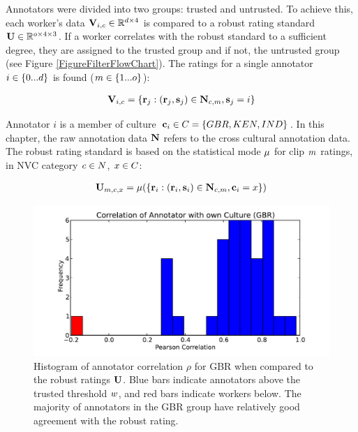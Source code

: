 Annotators were divided into two groups: trusted and untrusted. To achieve this, each worker's data $\textbf{V}_{i, c} \in \mathbb{R}^{d \times 4}$ is compared to a robust rating standard $\textbf{U} \in \mathbb{R}^{o \times 4 \times 3}$. If a worker correlates with the robust standard to a sufficient degree, they are assigned to the trusted group and if not, the untrusted group (see Figure \ref{FigureFilterFlowChart}). The ratings for a single annotator $i \in \{0...d\}$ is found ($m \in \{1...o\}$):

\begin{gather}
\textbf{V}_{i, c} = \{\textbf{r}_j: (\textbf{r}_j, \textbf{s}_j) \in \textbf{N}_{c,m}, \textbf{s}_j=i\} 
\end{gather}

Annotator $i$ is a member of culture $\textbf{c}_i \in C = \{GBR, KEN, IND\}$. In this chapter, the raw annotation data $\textbf{N}$ refers to the cross cultural annotation data. The robust rating standard is based on the statistical mode $\mu$ for clip $m$ ratings, in \ac{NVC} category $c \in N$, $x \in C$:

\begin{gather}
\textbf{U}_{m,c,x} = \mu(\{\textbf{r}_i: (\textbf{r}_i, \textbf{s}_i) \in \textbf{N}_{c,m}, \textbf{c}_i = x\})
\end{gather}

\begin{figure}
\centering
\includegraphics[width = 0.6 \columnwidth]{annotation/correlgbr.pdf}
\caption[Histogram of annotator correlation $\rho$ for GBR when compared to the robust ratings $\robustAnnotation$.]{Histogram of annotator correlation $\rho$ for GBR when compared to the robust ratings $\robustAnnotation$. Blue bars indicate annotators above the trusted threshold $w$, and red bars indicate workers below. The majority of annotators in the GBR group have relatively good agreement with the robust rating.}
\label{FigureCorrelationHistOfGbr}
\end{figure}

